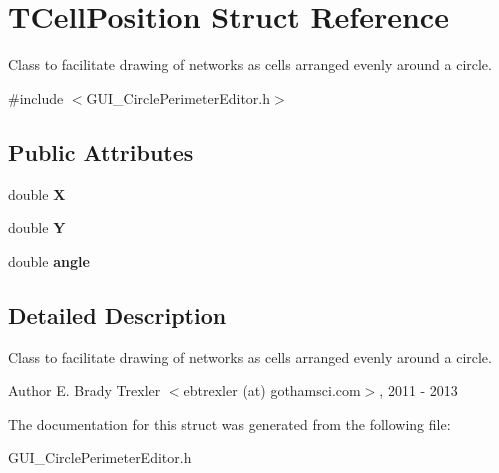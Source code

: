 \hypertarget{struct_t_cell_position}{\section{T\+Cell\+Position Struct Reference}
\label{struct_t_cell_position}
}


Class to facilitate drawing of networks as cells arranged evenly around a circle.  




{\ttfamily \#include $<$G\+U\+I\+\_\+\+Circle\+Perimeter\+Editor.\+h$>$}

\subsection*{Public Attributes}
\begin{DoxyCompactItemize}
\item 
\hypertarget{struct_t_cell_position_a9403569f9d252768c68f14e11fa866d8}{double {\bfseries X}}\label{struct_t_cell_position_a9403569f9d252768c68f14e11fa866d8}

\item 
\hypertarget{struct_t_cell_position_a7f80d7def2e0467a29dbaf827185d7da}{double {\bfseries Y}}\label{struct_t_cell_position_a7f80d7def2e0467a29dbaf827185d7da}

\item 
\hypertarget{struct_t_cell_position_a69fcd1a26b436ca9b904d99cac217035}{double {\bfseries angle}}\label{struct_t_cell_position_a69fcd1a26b436ca9b904d99cac217035}

\end{DoxyCompactItemize}


\subsection{Detailed Description}
Class to facilitate drawing of networks as cells arranged evenly around a circle. 

\begin{DoxyAuthor}{Author}
E. Brady Trexler $<$ebtrexler (at) gothamsci.\+com$>$, 2011 -\/ 2013 
\end{DoxyAuthor}


The documentation for this struct was generated from the following file\+:\begin{DoxyCompactItemize}
\item 
G\+U\+I\+\_\+\+Circle\+Perimeter\+Editor.\+h\end{DoxyCompactItemize}
